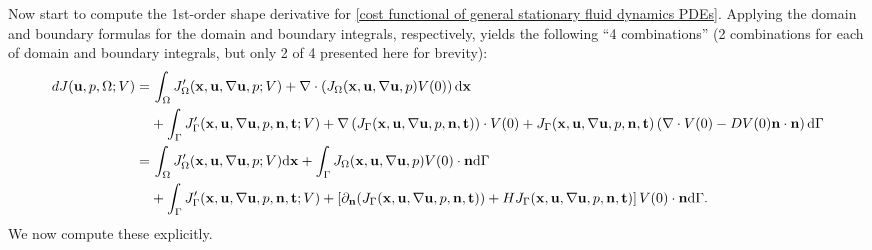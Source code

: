 \documentclass[oneside,11pt]{book}
\numberwithin{equation}{section}
\begin{document}
Now start to compute the 1st-order shape derivative for \eqref{cost functional of general stationary fluid dynamics PDEs}. Applying the domain and boundary formulas for the domain and boundary integrals, respectively, yields the following ``4 combinations'' (2 combinations for each of domain and boundary integrals, but only 2 of 4 presented here for brevity):
\begin{align*}
    dJ({\bf u},p,\Omega;V) =&\, \int_\Omega J_\Omega'({\bf x},{\bf u},\nabla{\bf u},p;V) + \nabla\cdot\left(J_\Omega({\bf x},{\bf u},\nabla{\bf u},p)V(0)\right){\rm d}{\bf x}\\
    &+ \int_\Gamma J_\Gamma'({\bf x},{\bf u},\nabla{\bf u},p,{\bf n},{\bf t};V) + \nabla\left(J_\Gamma({\bf x},{\bf u},\nabla{\bf u},p,{\bf n},{\bf t})\right)\cdot V(0) + J_\Gamma({\bf x},{\bf u},\nabla{\bf u},p,{\bf n},{\bf t})\left(\nabla\cdot V(0) - DV(0){\bf n}\cdot{\bf n}\right){\rm d}\Gamma\\
    =&\, \int_\Omega J_\Omega'({\bf x},{\bf u},\nabla{\bf u},p;V){\rm d}{\bf x} + \int_\Gamma J_\Omega({\bf x},{\bf u},\nabla{\bf u},p)V(0)\cdot{\bf n}{\rm d}\Gamma\\
    &+ \int_\Gamma J_\Gamma'({\bf x},{\bf u},\nabla{\bf u},p,{\bf n},{\bf t};V) + \left[\partial_{\bf n}(J_\Gamma({\bf x},{\bf u},\nabla{\bf u},p,{\bf n},{\bf t})) + HJ_\Gamma({\bf x},{\bf u},\nabla{\bf u},p,{\bf n},{\bf t})\right]V(0)\cdot{\bf n}{\rm d}\Gamma.
\end{align*}
We now compute these explicitly.
\end{document}
